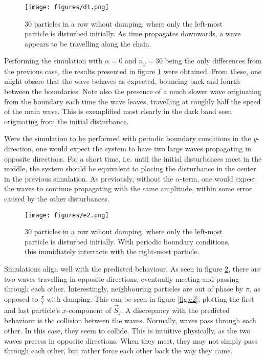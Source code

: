 \begin{figure}
    \centering
    \texttt{[image: figures/d1.png]}
    \caption{
        30 particles in a row wihout damping, where only the left-most particle is disturbed initially.
        As time propagates downwards, a wave appears to be travelling along the chain.
    }
    \label{fig:d1}
\end{figure}

Performing the simulation with $\alpha = 0$ and $n_y = 30$ being the only differences from the previous case, 
the results presented in figure \ref{fig:d1} were obtained. 
From these, one might obsere that the wave behaves as expected, bouncing back and fourth between the boundaries.
Note also the presence of a much slower wave originating from the boundary each time the wave leaves, 
travelling at roughly half the speed of the main wave. This is
exemplified most clearly in the dark band seen originating from the initial disturbance. 

Were the simulation to be performed with periodic boundary conditions in the $y$-direction, 
one would expect the system to have two large waves propagating in opposite directions. 
For a short time, i.e. until the initial disturbances meet in the middle, 
the system should be equivalent to placing the disturbance in the center in the previous simulation.
As previously, without the $\alpha$-term, one would expect the waves to continue propagating with the same amplitude,
within some error caused by the other disturbances.

\begin{figure}
    \centering
    \texttt{[image: figures/e2.png]}
    \caption{
        30 particles in a row wihout damping, where only the left-most particle is disturbed initially.
        With periodic boundary conditions, this immidiately interracts with the right-most particle.
    }
    \label{fig:e1}
\end{figure}


Simulations align well with the predicted behaviour. 
As seen in figure \ref{fig:e1}, there are two waves travelling in opposite directions, 
eventually meeting and passing through each other. 
Interestingly, neighbouring particles are out of phase by $\pi$, as opposed to $\frac{\pi}{2}$ with damping.
This can be seen in figure \ref{fig:e2}, plotting the first and last particle's $x$-component of $\vec{S}_j$.
A discrepancy with the predicted behaviour is the collision between the waves. 
Normally, waves pass through each other. In this case, they seem to collide.
This is intuitive physically, as the two waves precess in opposite directions. 
When they meet, they may not simply pass through each other, 
but rather force each other back the way they came. 


